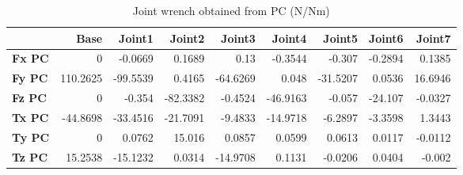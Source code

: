 \begin{table}[h!]
	\centering
	\caption{Joint wrench obtained from PC (N/Nm)}
	\label{wrech_PC_Pose14}
	\begin{tabular}{|l|r|r|r|r|r|r|r|r|}
		\hline
		\textbf{}  & \textbf{Base} & \textbf{Joint1}  & \textbf{Joint2}  & \textbf{Joint3}  & \textbf{Joint4}  & \textbf{Joint5}  & \textbf{Joint6}  & \textbf{Joint7} \\ \hline
		\textbf{Fx PC}  & 0        & -0.0669        & 0.1689        & 0.13        & -0.3544        & -0.307        & -0.2894        & 0.1385 \\ \hline
		\textbf{Fy PC}  & 110.2625        & -99.5539        & 0.4165        & -64.6269        & 0.048        & -31.5207        & 0.0536        & 16.6946 \\ \hline
		\textbf{Fz PC}  & 0        & -0.354        & -82.3382        & -0.4524        & -46.9163        & -0.057        & -24.107        & -0.0327 \\ \hline
		\textbf{Tx PC}  & -44.8698        & -33.4516        & -21.7091        & -9.4833        & -14.9718        & -6.2897        & -3.3598        & 1.3443 \\ \hline
		\textbf{Ty PC}  & 0        & 0.0762        & 15.016        & 0.0857        & 0.0599        & 0.0613        & 0.0117        & -0.0112 \\ \hline
		\textbf{Tz PC}  & 15.2538        & -15.1232        & 0.0314        & -14.9708        & 0.1131        & -0.0206        & 0.0404        & -0.002 \\ \hline
	\end{tabular}
\end{table}


